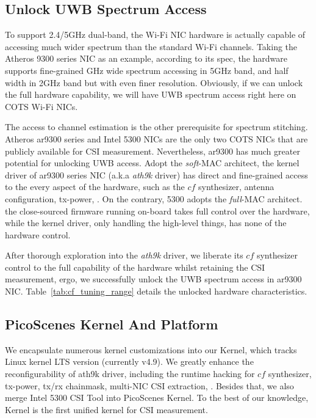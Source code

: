 
\subsection{Unlock UWB Spectrum Access} %
\label{sub:unlock_uwb_Scan_access_on_cots}


To support 2.4/5GHz dual-band,
the Wi-Fi NIC hardware is actually capable of accessing much wider spectrum than the standard Wi-Fi channels.
Taking the Atheros 9300 series NIC as an example,
according to its spec\cite{atheros_issc_papers},
the hardware supports fine-grained GHz wide spectrum accessing in 5GHz band, 
and half width in 2GHz band but with even finer resolution.
Obviously, if we can unlock the full hardware capability, 
we will have UWB spectrum access right here on COTS Wi-Fi NICs.

The access to channel estimation is the other prerequisite for spectrum stitching.
Atheros ar9300 series and Intel 5300 NICs 
are the only two COTS NICs that are publicly available for CSI measurement\cite{csitool, Xie2015Precise}.
Nevertheless, ar9300 has much greater potential for unlocking UWB access.
%
Adopt the \textit{soft}-MAC architect, 
the kernel driver of ar9300 series NIC (a.k.a \textit{ath9k} driver) 
has direct and fine-grained access to the every aspect of the hardware, 
such as the $cf$ synthesizer, antenna configuration, tx-power, \etc.
%
On the contrary, 5300 adopts the \textit{full}-MAC architect.
the close-sourced firmware running on-board takes full control over the hardware,
while the kernel driver,
only handling the high-level things,
has none of the hardware control.


After thorough exploration into the \textit{ath9k} driver, 
we liberate its $cf$ synthesizer control to the full capability of the hardware 
whilst retaining the CSI measurement,
ergo, 
we successfully unlock the UWB spectrum access in ar9300 NIC. 
Table~\ref{tab:cf_tuning_range} details the unlocked hardware characteristics. 


\subsection{PicoScenes Kernel And Platform} %
\label{sub:picoscenes_platfrom}

We encapsulate numerous kernel customizations into our \ourprotocol Kernel, which tracks Linux kernel LTS version (currently v4.9). We greatly enhance the reconfigurability of ath9k driver, including the runtime hacking for $cf$ synthesizer, tx-power, tx/rx chainmask, multi-NIC CSI extraction, \etc. Besides that, we also merge Intel 5300 CSI Tool\cite{csitool} into PicoScenes Kernel. To the best of our knowledge, \ourprotocol Kernel is the first unified kernel for CSI measurement.

